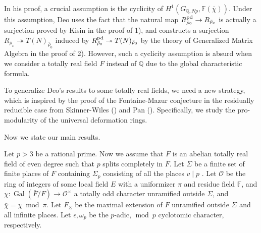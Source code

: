 \documentclass[12pt]{amsart}
\theoremstyle{plain}
\theoremstyle{definition}
\theoremstyle{remark}
\begin{document}
In his proof, a crucial assumption is the cyclicity of $H^1(G_{\mathbb{Q}, Np}, \mathbb{F}(\bar{\chi}))$. Under this assumption, Deo uses the fact that the natural map $R_{\bar{\rho}_0}^{\textnormal{pd}} \to R_{\bar{\rho}_x} $ is actually a surjection proved by Kisin \cite[Corollary 1.4.4]{kisin2009fontaine} in the proof of 1), and constructs a surjection $R_{\bar{\rho}_x} \twoheadrightarrow T(N)_{\bar{\rho}_0} $ induced by $R_{\bar{\rho}_0}^{\textnormal{pd}} \twoheadrightarrow T(N)_{\bar{\rho}_0}$ by the theory of Generalized Matrix Algebra in the proof of 2). However, such a cyclicity assumption is absurd when we consider a totally real field $F$ instead of $\mathbb{Q}$ due to the global characteristic formula.

To generalize Deo's results to some totally real fields, we need a new strategy, which is inspired by the proof of the Fontaine-Mazur conjecture in the residually reducible case from Skinner-Wiles (\cite{skinner1999residually}) and Pan (\cite{pan2022fontaine}).
Specifically, we study the pro-modularity of the universal deformation rings.

Now we state our main results.

 Let $p>3$ be a rational prime. Now we assume that $F$ is an abelian totally real field of even degree such that $p$ splits completely in $F$. Let $\Sigma$ be a finite set of finite places of $F$ containing $\Sigma_p $ consisting of all the places $v \mid p$ . Let $\mathcal{O}$ be the ring of integers of some local field $E$ with a uniformizer $\pi$ and residue field $\mathbb{F}$, and $\chi: \operatorname{Gal}(\bar{F}/F) \to \mathcal{O}^\times$ a totally odd character unramified outside $\Sigma$, and $\bar{\chi}=\chi ~\operatorname{mod} ~\pi$. Let $F_{\Sigma}$ be the maximal extension of $F$ unramified outside $\Sigma$ and all infinite places. Let $\epsilon, \omega_p$ be the $p$-adic, $\operatorname{mod}~p$ cyclotomic character, respectively.
 
\end{document}
